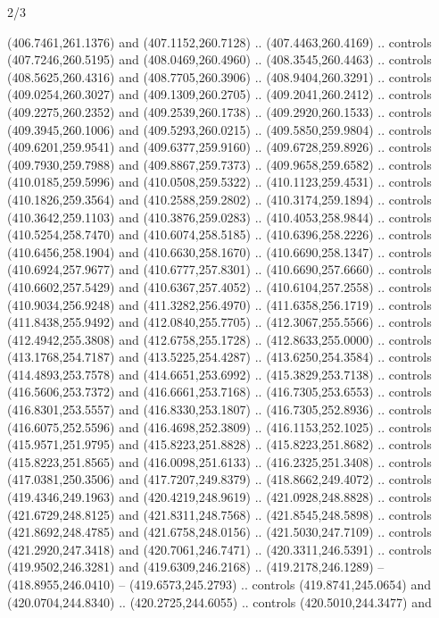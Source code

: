 \begin{flagdescription}{2/3}
\begin{scope}[xshift=0.5\flaglength,yshift=0.5\flagwidth,scale=\flagwidth/495.65]
\begin{scope}[y=0.8pt, x=0.8pt, yscale=-1,shift={(-463.76,-309.78)}]
  (406.7461,261.1376) and (407.1152,260.7128) .. (407.4463,260.4169) .. controls
  (407.7246,260.5195) and (408.0469,260.4960) .. (408.3545,260.4463) .. controls
  (408.5625,260.4316) and (408.7705,260.3906) .. (408.9404,260.3291) .. controls
  (409.0254,260.3027) and (409.1309,260.2705) .. (409.2041,260.2412) .. controls
  (409.2275,260.2352) and (409.2539,260.1738) .. (409.2920,260.1533) .. controls
  (409.3945,260.1006) and (409.5293,260.0215) .. (409.5850,259.9804) .. controls
  (409.6201,259.9541) and (409.6377,259.9160) .. (409.6728,259.8926) .. controls
  (409.7930,259.7988) and (409.8867,259.7373) .. (409.9658,259.6582) .. controls
  (410.0185,259.5996) and (410.0508,259.5322) .. (410.1123,259.4531) .. controls
  (410.1826,259.3564) and (410.2588,259.2802) .. (410.3174,259.1894) .. controls
  (410.3642,259.1103) and (410.3876,259.0283) .. (410.4053,258.9844) .. controls
  (410.5254,258.7470) and (410.6074,258.5185) .. (410.6396,258.2226) .. controls
  (410.6456,258.1904) and (410.6630,258.1670) .. (410.6690,258.1347) .. controls
  (410.6924,257.9677) and (410.6777,257.8301) .. (410.6690,257.6660) .. controls
  (410.6602,257.5429) and (410.6367,257.4052) .. (410.6104,257.2558) .. controls
  (410.9034,256.9248) and (411.3282,256.4970) .. (411.6358,256.1719) .. controls
  (411.8438,255.9492) and (412.0840,255.7705) .. (412.3067,255.5566) .. controls
  (412.4942,255.3808) and (412.6758,255.1728) .. (412.8633,255.0000) .. controls
  (413.1768,254.7187) and (413.5225,254.4287) .. (413.6250,254.3584) .. controls
  (414.4893,253.7578) and (414.6651,253.6992) .. (415.3829,253.7138) .. controls
  (416.5606,253.7372) and (416.6661,253.7168) .. (416.7305,253.6553) .. controls
  (416.8301,253.5557) and (416.8330,253.1807) .. (416.7305,252.8936) .. controls
  (416.6075,252.5596) and (416.4698,252.3809) .. (416.1153,252.1025) .. controls
  (415.9571,251.9795) and (415.8223,251.8828) .. (415.8223,251.8682) .. controls
  (415.8223,251.8565) and (416.0098,251.6133) .. (416.2325,251.3408) .. controls
  (417.0381,250.3506) and (417.7207,249.8379) .. (418.8662,249.4072) .. controls
  (419.4346,249.1963) and (420.4219,248.9619) .. (421.0928,248.8828) .. controls
  (421.6729,248.8125) and (421.8311,248.7568) .. (421.8545,248.5898) .. controls
  (421.8692,248.4785) and (421.6758,248.0156) .. (421.5030,247.7109) .. controls
  (421.2920,247.3418) and (420.7061,246.7471) .. (420.3311,246.5391) .. controls
  (419.9502,246.3281) and (419.6309,246.2168) .. (419.2178,246.1289) --
  (418.8955,246.0410) -- (419.6573,245.2793) .. controls (419.8741,245.0654) and
  (420.0704,244.8340) .. (420.2725,244.6055) .. controls (420.5010,244.3477) and

\end{scope}
\end{scope}
\end{flagdescription}
